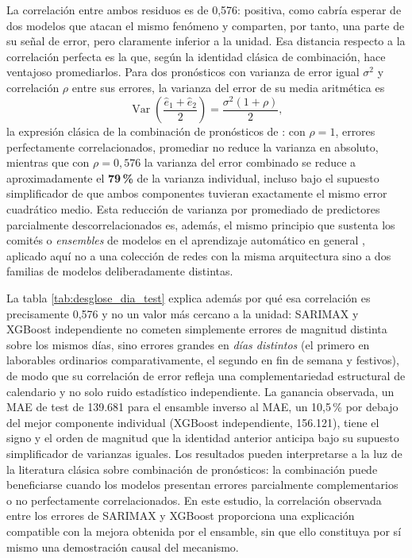 La correlación entre ambos residuos es de 0,576: positiva, como cabría esperar de dos
modelos que atacan el mismo fenómeno y comparten, por tanto, una parte de su señal de
error, pero claramente inferior a la unidad. Esa distancia respecto a la correlación
perfecta es la que, según la identidad clásica de combinación, hace ventajoso promediarlos. Para dos pronósticos con varianza de error igual $\sigma^2$ y correlación
$\rho$ entre sus errores, la varianza del error de su media aritmética es
\[
  \operatorname{Var}\!\left(\frac{\hat e_1 + \hat e_2}{2}\right)
    = \frac{\sigma^2 (1 + \rho)}{2},
\]
la expresión clásica de la combinación de pronósticos de
\textcite{bates1969combination}: con $\rho = 1$, errores perfectamente correlacionados,
promediar no reduce la varianza en absoluto, mientras que con $\rho = 0{,}576$ la
varianza del error combinado se reduce a aproximadamente el \textbf{79\,\%} de la varianza
individual, incluso bajo el supuesto simplificador de que ambos componentes tuvieran
exactamente el mismo error cuadrático medio. Esta reducción de varianza por promediado de predictores parcialmente descorrelacionados
es, además, el mismo principio que sustenta los comités o \emph{ensembles} de modelos en
el aprendizaje automático en general \parencite{perrone1993networks}, aplicado aquí no a
una colección de redes con la misma arquitectura sino a dos familias de modelos
deliberadamente distintas.

La tabla \ref{tab:desglose_dia_test} explica además por qué esa correlación es
precisamente 0,576 y no un valor más cercano a la unidad: SARIMAX y XGBoost independiente
no cometen simplemente errores de magnitud distinta sobre los mismos días, sino errores
grandes en \emph{días distintos} (el primero en laborables ordinarios comparativamente,
el segundo en fin de semana y festivos), de modo que su correlación de error refleja una
complementariedad estructural de calendario y no solo ruido estadístico independiente. La
ganancia observada, un MAE de test de 139.681 para el ensamble inverso al MAE, un
10,5\,\% por debajo del mejor componente individual (XGBoost independiente, 156.121),
tiene el signo y el orden de magnitud que la identidad anterior anticipa bajo su supuesto
simplificador de varianzas iguales. Los resultados pueden interpretarse a la luz de la
literatura clásica sobre combinación de pronósticos: la combinación puede beneficiarse
cuando los modelos presentan errores parcialmente complementarios o no perfectamente
correlacionados. En este estudio, la correlación observada entre los errores de SARIMAX y
XGBoost proporciona una explicación compatible con la mejora obtenida por el ensamble, sin
que ello constituya por sí mismo una demostración causal del mecanismo.


